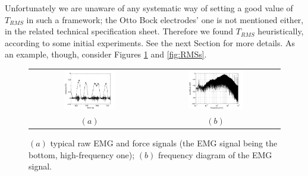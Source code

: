 Unfortunately we are unaware of any systematic way of setting a good
value of $T_{RMS}$ in such a framework; the Otto Bock electrodes' one
is not mentioned either, in the related technical specification
sheet. Therefore we found $T_{RMS}$ heuristically, according to some
initial experiments. See the next Section for more details. As an
example, though, consider Figures \ref{fig:spectra} and
\ref{fig:RMSs}.

\begin{figure}[!ht] \centering
  \begin{tabular}{cc}
    \includegraphics[width=0.45\textwidth]{figs/force_raw} &
    \includegraphics[width=0.45\textwidth]{figs/spectrum_raw} \\
    $(a)$ & $(b)$ \\
  \end{tabular}
  \caption{$(a)$ typical raw EMG and force signals (the EMG signal
    being the bottom, high-frequency one); $(b)$ frequency diagram of
    the EMG signal.}
  \label{fig:spectra}
\end{figure}

